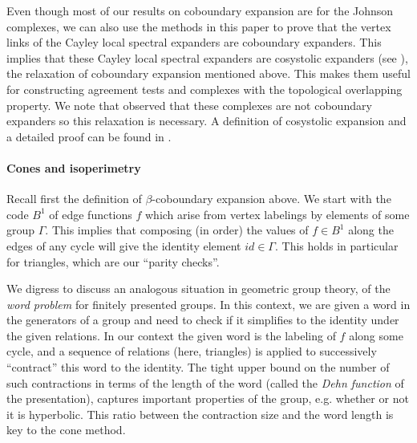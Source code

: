 Even though most of our results on coboundary expansion are for the Johnson complexes, we can also use the methods in this paper to prove that the vertex links of the \cite{Golowich2023} Cayley local spectral expanders are coboundary expanders. This implies that these Cayley local spectral expanders are cosystolic expanders (see \cite{KaufmanKL2016,DiksteinD2023cbdry}), the relaxation of coboundary expansion mentioned above. This makes them useful for constructing agreement tests and complexes with the topological overlapping property. We note that \cite{Golowich2023} observed that these complexes are not coboundary expanders so this relaxation is necessary. A definition of cosystolic expansion and a detailed proof can be found in .

\paragraph{Cones and isoperimetry}
Recall first the definition of $\beta$-coboundary expansion above. We start with the code \(B^1\) of edge functions $f$ which arise from vertex labelings by elements of some group $\Gamma$. This implies that composing (in order) the values of $f\in B^1$ along the edges of any cycle will give the identity element $id \in \Gamma$. This holds in particular for triangles, which are our ``parity checks''.

We digress to discuss an analogous situation in geometric group theory, of the \emph{word problem} for finitely presented groups. In this context, we are given a word in the generators of a group and need to check if it simplifies to the identity under the given relations. In our context the given word is the labeling of $f$ along some cycle, and a sequence of relations (here, triangles) is applied to successively ``contract'' this word to the identity. The tight upper bound on the number of such contractions in terms of the length of the word (called the \emph{Dehn function} of the presentation), captures important properties of the group, e.g. whether or not it is hyperbolic. This ratio between the contraction size and the word length is key to the cone method. 

